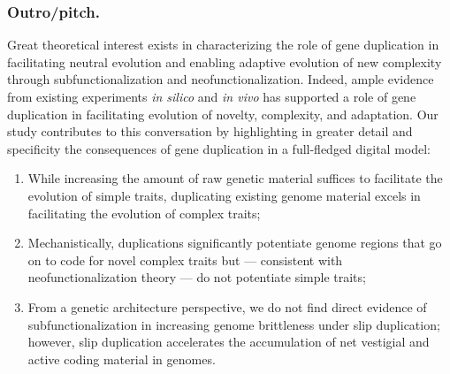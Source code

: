 \subsubsection{Outro/pitch.}
Great theoretical interest exists in characterizing the role of gene duplication in facilitating neutral evolution and enabling adaptive evolution of new complexity through subfunctionalization and neofunctionalization.
Indeed, ample evidence from existing experiments \textit{in silico} and \textit{in vivo} has supported a role of gene duplication in facilitating evolution of novelty, complexity, and adaptation.
Our study contributes to this conversation by highlighting in greater detail and specificity the consequences of gene duplication in a full-fledged digital model:
\begin{enumerate}
\item While increasing the amount of raw genetic material suffices to facilitate the evolution of simple traits, duplicating existing genome material excels in facilitating the evolution of complex traits;
\item Mechanistically, duplications significantly potentiate genome regions that go on to code for novel complex traits but --- consistent with neofunctionalization theory --- do not potentiate simple traits;
\item From a genetic architecture perspective, we do not find direct evidence of subfunctionalization in increasing genome brittleness under slip duplication; however, slip duplication accelerates the accumulation of net vestigial and active coding material in genomes.
\end{enumerate}


